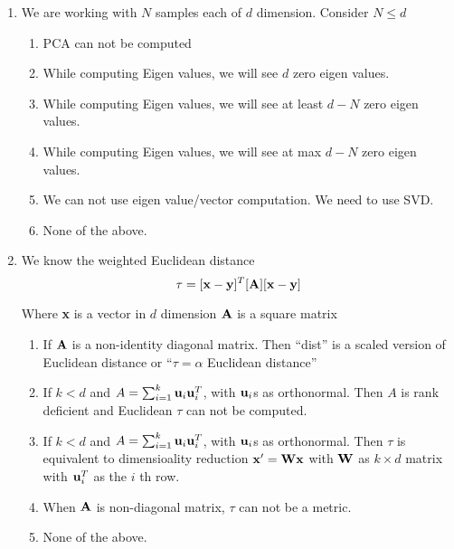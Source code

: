 \documentclass{article}
\begin{document}
\begin{enumerate}
     \item We are working with $N$ samples each of $d$ dimension.
     Consider $N\le d$

     \begin{enumerate}
         \item PCA can not be computed
         \item While computing Eigen values, we will see $d$ zero eigen values.
         \item While computing Eigen values, we will see at least $d-N$ zero eigen values.
         \item While computing Eigen values, we will see at max $d-N$ zero eigen values.
         \item We can not use eigen value/vector computation. We need to use SVD.
         \item None of the above.
     \end{enumerate}



     \item We know the weighted Euclidean distance
     \[ \tau = [{\bf x} - {\bf y}]^T[{\bf A}][{\bf x} - {\bf y}] \]

     Where {\bf x} is a vector in $d$ dimension ${\bf A}$ is a square matrix

     \begin{enumerate}
         \item If ${\bf A}$ is a non-identity diagonal matrix. Then ``dist'' is a scaled version of Euclidean distance or ``$\tau  = \alpha$  Euclidean distance''

         \item If $k < d$ and $A = \sum_{i=1}^k {\bf u}_i{\bf u}_i^T$, with ${\bf u}_i$s as orthonormal. Then $A$ is rank deficient and Euclidean $\tau$ can not be computed.

         \item If $k < d$ and $A = \sum_{i=1}^k {\bf u}_i{\bf u}_i^T$, with ${\bf u}_i$s as orthonormal. Then $\tau$ is equivalent to dimensioality reduction ${\bf x}^\prime = {\bf W}{\bf x}$ with ${\bf W}$ as $k\times d$ matrix with ${\bf u}_i^T$ as the $i$ th row.

         \item When ${\bf A}$ is non-diagonal matrix, $\tau$ can not be a metric.

         \item None of the above.


\end{enumerate}
\end{enumerate}
\end{document}
